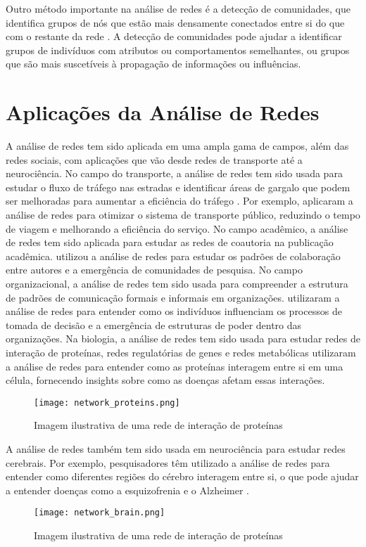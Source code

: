 Outro método importante na análise de redes é a detecção de comunidades, que identifica grupos de nós que estão mais densamente conectados entre si do que com o restante da rede \cite[]{2004_Newman}. A detecção de comunidades pode ajudar a identificar grupos de indivíduos com atributos ou comportamentos semelhantes, ou grupos que são mais suscetíveis à propagação de informações ou influências.

\section{Aplicações da Análise de Redes}

A análise de redes tem sido aplicada em uma ampla gama de campos, além das redes sociais, com aplicações que vão desde redes de transporte até a neurociência. No campo do transporte, a análise de redes tem sido usada para estudar o fluxo de tráfego nas estradas e identificar áreas de gargalo que podem ser melhoradas para aumentar a eficiência do tráfego \cite[]{2012_Levinson}. Por exemplo,  aplicaram a análise de redes para otimizar o sistema de transporte público, reduzindo o tempo de viagem e melhorando a eficiência do serviço. No campo acadêmico, a análise de redes tem sido aplicada para estudar as redes de coautoria na publicação acadêmica.  utilizou a análise de redes para estudar os padrões de colaboração entre autores e a emergência de comunidades de pesquisa. No campo organizacional, a análise de redes tem sido usada para compreender a estrutura de padrões de comunicação formais e informais em organizações.  utilizaram a análise de redes para entender como os indivíduos influenciam os processos de tomada de decisão e a emergência de estruturas de poder dentro das organizações. Na biologia, a análise de redes tem sido usada para estudar redes de interação de proteínas, redes regulatórias de genes e redes metabólicas  utilizaram a análise de redes para entender como as proteínas interagem entre si em uma célula, fornecendo insights sobre como as doenças afetam essas interações.
\begin{figure}[!htb]
    \caption{Imagem ilustrativa de uma rede de interação de proteínas}
    \label{fig:network_proteins}
    \centering
    \texttt{[image: network\_proteins.png]}
\end{figure}
A análise de redes também tem sido usada em neurociência para estudar redes cerebrais. Por exemplo, pesquisadores têm utilizado a análise de redes para entender como diferentes regiões do cérebro interagem entre si, o que pode ajudar a entender doenças como a esquizofrenia e o Alzheimer \cite[]{2009_Bullmore}.
\begin{figure}[!htb]
    \caption{Imagem ilustrativa de uma rede de interação de proteínas}
    \label{fig:network_brain}
    \centering
    \texttt{[image: network\_brain.png]}
\end{figure}

